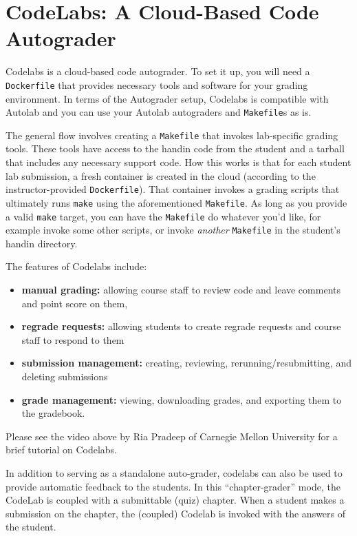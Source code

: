 \chapter{CodeLabs: A Cloud-Based Code Autograder}
\label{ch:codelabs}

Codelabs is a cloud-based code autograder.  To set it up, you will
need a \verb|Dockerfile| that provides necessary tools and software for your grading environment.  
In terms of the Autograder setup, Codelabs is compatible with
Autolab and you can use your Autolab autograders and \verb|Makefile|s as is.

The general flow involves creating a \verb|Makefile| that invokes lab-specific
grading tools. These tools have access to the handin code from the student and
a tarball that includes any necessary support code. How this works is that for
each student lab submission, a fresh container is created in the cloud
(according to the instructor-provided \verb|Dockerfile|). That container
invokes a grading scripts that ultimately runs \verb|make| using the
aforementioned \verb|Makefile|. As long as you provide a valid \verb|make|
target, you can have the \verb|Makefile| do whatever you'd like, for example
invoke some other scripts, or invoke \textit{another} \verb|Makefile| in the
student's handin directory. 

The features of Codelabs include:
\begin{itemize}
\item  
\textbf{manual grading:} allowing course staff to review code and leave comments and point
score on them,

\item
\textbf{regrade requests:} allowing students to create regrade
requests and course staff to respond to them

\item
  \textbf{submission management:} creating, reviewing, rerunning/resubmitting, and deleting submissions

\item
  \textbf{grade management:} viewing, downloading grades, and exporting them to the gradebook.
\end{itemize}
%
Please see the video above by Ria Pradeep of Carnegie Mellon University for a brief tutorial on Codelabs.

In addition to serving as a standalone auto-grader, codelabs can also
be used to provide automatic feedback to the students.
%
In this ``chapter-grader'' mode, the CodeLab is coupled with a submittable
(quiz) chapter.
%
When a student makes a submission on the chapter, the (coupled) Codelab is invoked with the answers of the student.

